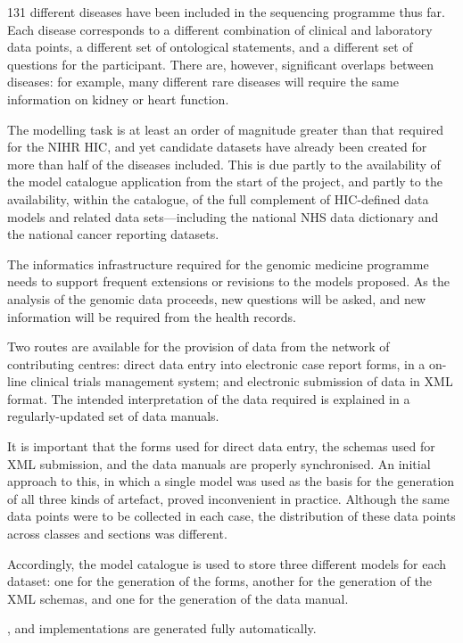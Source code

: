 131 different diseases have been included in the sequencing programme
thus far.  Each disease corresponds to a different combination of
clinical and laboratory data points, a different set of ontological
statements, and a different set of questions for the participant.
There are, however, significant overlaps between diseases: for
example, many different rare diseases will require the same
information on kidney or heart function.   

The modelling task is at least an order of magnitude greater than that
required for the NIHR HIC, and yet candidate datasets have already
been created for more than half of the diseases included.  This is due
partly to the availability of the model catalogue application from the
start of the project, and partly to the availability, within the
catalogue, of the full complement of HIC-defined data models and
related data sets---including the national NHS data dictionary and the
national cancer reporting datasets.

The informatics infrastructure required for the genomic medicine
programme needs to support frequent extensions or revisions to the
models proposed.  As the analysis of the genomic data proceeds, new
questions will be asked, and new information will be required from the
health records.  

Two routes are available for the provision of data from the network of
contributing centres: direct data entry into electronic case report
forms, in a on-line clinical trials management system; and electronic
submission of data in XML format.  The intended interpretation of the
data required is explained in a regularly-updated set of data
manuals.   

It is important that the forms used for direct data entry, the schemas
used for XML submission, and the data manuals are properly
synchronised.  An initial approach to this, in which a single model
was used as the basis for the generation of all three kinds of
artefact, proved inconvenient in practice.  Although the same data
points were to be collected in each case, the distribution of these
data points across classes and sections was different.

Accordingly, the model catalogue is used to store three different
models for each dataset: one for the generation of the forms, another
for the generation of the XML schemas, and one for the generation of
the data manual. 

, and implementations are
generated fully automatically.

